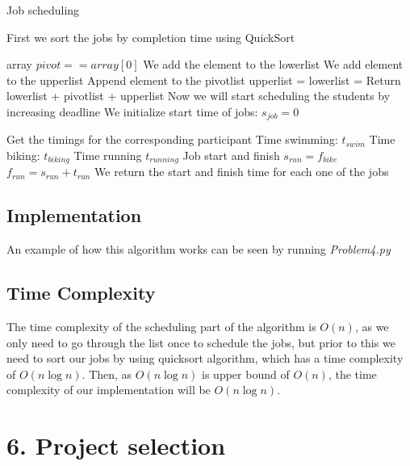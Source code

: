 \documentclass{article}
\begin{document}
\begin{algorithm}[H]
\caption{Job scheduling}
\begin{algorithmic}[1]
\State First we sort the jobs by completion time using QuickSort

  \Return array
 \EndIf
  \State $pivot == array[0]$
    \State We add the element to the lowerlist
   \EndIf
    \State We add element to the upperlist
   \EndIf
    \State Append element to the pivotlist
   \EndIf
  \EndFor
  \State upperlist = 
  \State lowerlist = 
 \EndIf
 \State Return lowerlist + pivotlist + upperlist
\EndFunction
\State
\State Now we will start scheduling the students by increasing deadline
\State We initialize start time of jobs: $s_{job} = 0$

 \State Get the timings for the corresponding participant
 \State Time swimming: $t_{swim}$
 \State Time biking: $t_{biking}$
 \State Time running $t_{running}$
 \State
 \State Job start and finish
 \State $s_{run} = f_{bike}$
 \State $f_{run} = s_{run} + t_{run}$
 \State
 \State We return the start and finish time for each one of the jobs

\EndWhile
\end{algorithmic}
\end{algorithm}

\subsection*{Implementation}

An example of how this algorithm works can be seen by running \textit{Problem4.py}

\subsection*{Time Complexity}

The time complexity of the scheduling part of the algorithm is $O(n)$, as we only need to go through the list once to schedule the jobs, but prior to this we need to sort our jobs by using quicksort algorithm, which has a time complexity of $O(n\log n)$. Then, as $O(n\log n)$ is upper bound of $O(n)$, the time complexity of our implementation will be $O(n\log n)$.

\section*{6. Project selection}
\end{document}
